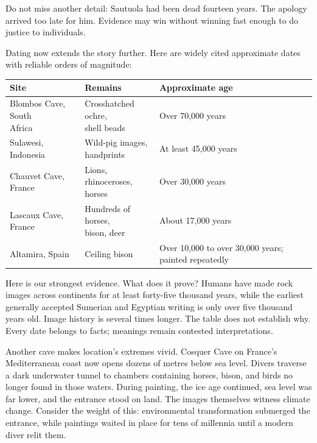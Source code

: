 Do not miss another detail: Sautuola had been dead fourteen years. The apology arrived too late for him. Evidence may win without winning fast enough to do justice to individuals.

Dating now extends the story further. Here are widely cited approximate dates with reliable orders of magnitude:

\noindent
\begin{tabularx}{\linewidth}{llX}
\toprule
Site & Remains & Approximate age \\
\midrule
\shortstack[l]{Blombos Cave, South\\ Africa} & \shortstack[l]{Crosshatched ochre,\\ shell beads} & Over 70,000 years \\
Sulawesi, Indonesia & \shortstack[l]{Wild-pig images,\\ handprints} & At least 45,000 years \\
Chauvet Cave, France & \shortstack[l]{Lions, rhinoceroses,\\ horses} & Over 30,000 years \\
Lascaux Cave, France & \shortstack[l]{Hundreds of horses,\\ bison, deer} & About 17,000 years \\
Altamira, Spain & Ceiling bison & Over 10,000 to over 30,000 years; painted repeatedly \\
\bottomrule
\end{tabularx}

\smallskip
Here is our strongest evidence. What does it prove? Humans have made rock images across continents for at least forty-five thousand years, while the earliest generally accepted Sumerian and Egyptian writing is only over five thousand years old. Image history is several times longer. The table does not establish why. Every date belongs to facts; meanings remain contested interpretations.

Another cave makes location's extremes vivid. Cosquer Cave on France's Mediterranean coast now opens dozens of metres below sea level. Divers traverse a dark underwater tunnel to chambers containing horses, bison, and birds no longer found in those waters. During painting, the ice age continued, sea level was far lower, and the entrance stood on land. The images themselves witness climate change. Consider the weight of this: environmental transformation submerged the entrance, while paintings waited in place for tens of millennia until a modern diver relit them.


